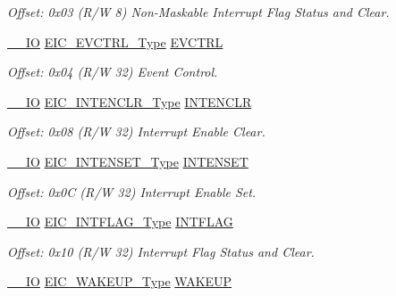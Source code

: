 \begin{DoxyCompactItemize}
\begin{DoxyCompactList}\small\item\em Offset\+: 0x03 (R/W 8) Non-\/\+Maskable Interrupt Flag Status and Clear. \end{DoxyCompactList}\item 
\mbox{\hyperlink{core__cm0plus_8h_aec43007d9998a0a0e01faede4133d6be}{\+\_\+\+\_\+\+IO}} \mbox{\hyperlink{union_e_i_c___e_v_c_t_r_l___type}{E\+I\+C\+\_\+\+E\+V\+C\+T\+R\+L\+\_\+\+Type}} \mbox{\hyperlink{struct_eic_a2a8a3f11520e68984482b92a83f5c480}{E\+V\+C\+T\+RL}}
\begin{DoxyCompactList}\small\item\em Offset\+: 0x04 (R/W 32) Event Control. \end{DoxyCompactList}\item 
\mbox{\hyperlink{core__cm0plus_8h_aec43007d9998a0a0e01faede4133d6be}{\+\_\+\+\_\+\+IO}} \mbox{\hyperlink{union_e_i_c___i_n_t_e_n_c_l_r___type}{E\+I\+C\+\_\+\+I\+N\+T\+E\+N\+C\+L\+R\+\_\+\+Type}} \mbox{\hyperlink{struct_eic_adb470536bf51d4bf9373eafef91f0017}{I\+N\+T\+E\+N\+C\+LR}}
\begin{DoxyCompactList}\small\item\em Offset\+: 0x08 (R/W 32) Interrupt Enable Clear. \end{DoxyCompactList}\item 
\mbox{\hyperlink{core__cm0plus_8h_aec43007d9998a0a0e01faede4133d6be}{\+\_\+\+\_\+\+IO}} \mbox{\hyperlink{union_e_i_c___i_n_t_e_n_s_e_t___type}{E\+I\+C\+\_\+\+I\+N\+T\+E\+N\+S\+E\+T\+\_\+\+Type}} \mbox{\hyperlink{struct_eic_a0be003d42a915e612f605948e929f416}{I\+N\+T\+E\+N\+S\+ET}}
\begin{DoxyCompactList}\small\item\em Offset\+: 0x0C (R/W 32) Interrupt Enable Set. \end{DoxyCompactList}\item 
\mbox{\hyperlink{core__cm0plus_8h_aec43007d9998a0a0e01faede4133d6be}{\+\_\+\+\_\+\+IO}} \mbox{\hyperlink{union_e_i_c___i_n_t_f_l_a_g___type}{E\+I\+C\+\_\+\+I\+N\+T\+F\+L\+A\+G\+\_\+\+Type}} \mbox{\hyperlink{struct_eic_a594641dd707e461963d9b7ce17b10dd9}{I\+N\+T\+F\+L\+AG}}
\begin{DoxyCompactList}\small\item\em Offset\+: 0x10 (R/W 32) Interrupt Flag Status and Clear. \end{DoxyCompactList}\item 
\mbox{\hyperlink{core__cm0plus_8h_aec43007d9998a0a0e01faede4133d6be}{\+\_\+\+\_\+\+IO}} \mbox{\hyperlink{union_e_i_c___w_a_k_e_u_p___type}{E\+I\+C\+\_\+\+W\+A\+K\+E\+U\+P\+\_\+\+Type}} \mbox{\hyperlink{struct_eic_ac9247c83eaea1b7fcd50accc7ab23e71}{W\+A\+K\+E\+UP}}

\end{DoxyCompactItemize}
